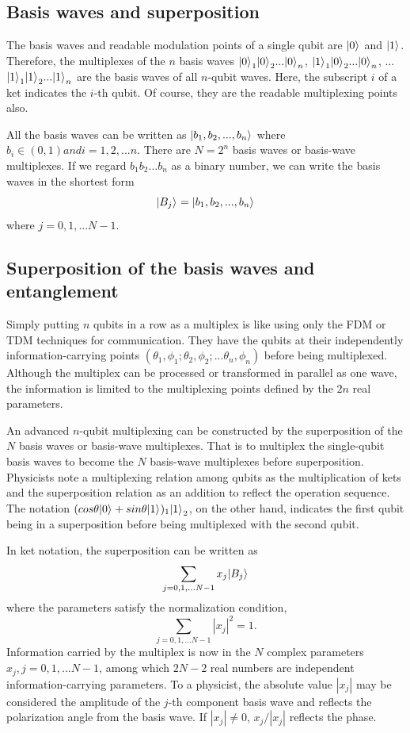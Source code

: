\documentclass[oneside, letter, 12pt]{book}
\begin{document}
\subsection{Basis waves and superposition}
The basis waves and readable modulation points of a single qubit are $\vert {0} \rangle_{}$ and $\vert {1} \rangle_{}$. Therefore, the multiplexes of the $n$ basis waves ${\vert {0} \rangle_{}}_1 {\vert {0} \rangle_{}}_2 ... {\vert {0} \rangle_{}}_n$,  ${\vert {1} \rangle_{}}_1 {\vert {0} \rangle_{}}_2 ... {\vert {0} \rangle_{}}_n$, ... ${\vert {1} \rangle_{}}_1 {\vert {1} \rangle_{}}_2 ... {\vert {1} \rangle_{}}_n$ are the basis waves of all $n$-qubit waves. Here, the subscript $i$ of a ket indicates the $i$-th qubit. Of course, they are the readable multiplexing points also.

All the basis waves can be written as $\vert {b_1, b_2, ..., b_n} \rangle_{}$ where $b_i \in (0,1) and i=1, 2, ... n$. There are $N=2^n$ basis waves or basis-wave multiplexes. If we regard $b_1 b_2 ... b_n$ as a binary number, we can write the basis waves in the shortest form
\begin{equation}
    \vert {B_j} \rangle_{} = \vert {b_1, b_2, ..., b_n} \rangle_{}
\end{equation}
where $j=0, 1, ... N-1$.

\subsection{Superposition of the basis waves and entanglement}
Simply putting $n$ qubits in a row as a multiplex is like using only the FDM or TDM techniques for communication. They have the qubits at their independently information-carrying points $(\theta_1, \phi_1; \theta_2, \phi_2; ... \theta_n, \phi_n)$ before being multiplexed. Although the multiplex can be processed or transformed in parallel as one wave, the information is limited to the multiplexing points defined by the $2n$ real parameters.

An advanced $n$-qubit multiplexing can be constructed by the superposition of the $N$ basis waves or basis-wave multiplexes. That is to multiplex the single-qubit basis waves to become the $N$ basis-wave multiplexes before superposition. Physicists note a multiplexing relation among qubits as the multiplication of kets and the superposition relation as an addition to reflect the operation sequence. The notation $(cos\theta \vert {0} \rangle_{} + sin\theta \vert {1} \rangle_{})_1 {\vert {1} \rangle_{}}_2$, on the other hand, indicates the first qubit being in a superposition before being multiplexed with the second qubit.

In ket notation, the superposition can be written as
\begin{equation}
    \sum_{j = 0, 1, ... N-1} x_j \vert {B_j} \rangle_{}
\end{equation}
where the parameters satisfy the normalization condition,
\begin{equation}
    \sum_{j = 0, 1, ... N-1} |x_j|^2 =1.
\end{equation}
Information carried by the multiplex is now in the $N$ complex parameters ${x_j, j=0, 1, ... N-1}$, among which $2N-2$ real numbers are independent information-carrying parameters. To a physicist, the absolute value $|x_j|$ may be considered the amplitude of the $j$-th component basis wave and reflects the polarization angle from the basis wave. If $|x_j| \neq 0$, $x_j / |x_j|$ reflects the phase.
\end{document}
